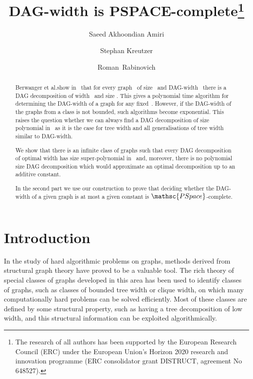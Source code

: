 \documentclass[authoryear]{article}
\theoremstyle{definition}
\newcommand{\0}{\emptyset}
\newcommand{\pspace}{\ensuremath{\mathsc{PSpace}}\xspace}
\newcommand{\tw}{tree {}width\xspace}
\newcommand{\dagw}{DAG-{}width\xspace}
\begin{document}
  \title{DAG-width is PSPACE-complete\thanks{The research of all authors has
    been supported by the European Research Council (ERC) under the European Union’s Horizon 2020 research and
    innovation programme (ERC consolidator grant DISTRUCT, agreement No 648527).}}
  \author[ ]{Saeed Akhoondian Amiri}
  \author[ ]{Stephan Kreutzer}
  \author[ ]{Roman~Rabinovich}
  \date{}

\maketitle
  
\begin{abstract}

  Berwanger et al.\@ show in~\cite{BerwangerDawHunKreObd12} that for
  every graph~ of size~ and \dagw~ there is a DAG
  decomposition of width~ and size . This gives a
  polynomial time algorithm for determining the \dagw of a graph for
  any fixed~. However, if the \dagw of the graphs from a class is
  not bounded, such algorithms become exponential. This raises the
  question whether we can always find a DAG decomposition of size
  polynomial in~ as it is the case for \tw and all generalisations
  of \tw similar to \dagw.

  We show that  there is an infinite class of graphs such that every DAG
  decomposition of optimal width has size super-polynomial in~ and,
  moreover, there is no polynomial size DAG decomposition 
  which would approximate an optimal decomposition up to
  an additive constant.

  In the second part we use our construction to prove that deciding
  whether the DAG-width of a given graph is at most a given constant
  is \pspace-complete.


\end{abstract}

 


\section{Introduction}

In the study of hard algorithmic problems on graphs,
methods derived from structural graph theory have proved to be a
valuable tool. The rich theory of special classes of graphs developed
in this area has been used to identify classes of graphs, such as
classes of bounded tree width or clique width,
on which many computationally hard problems can be solved
efficiently. 
Most of these classes are defined by some structural
property, such as having a tree decomposition of low width, and this structural 
information can be exploited
algorithmically. 
\end{document}
